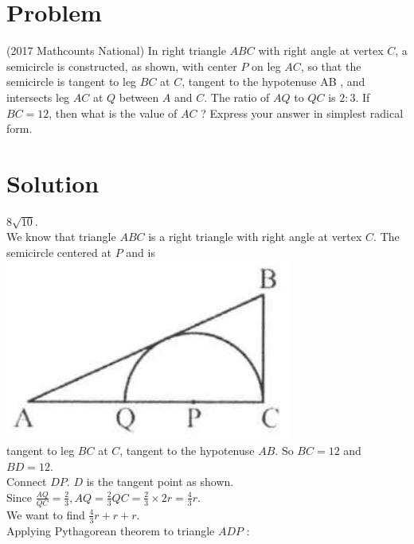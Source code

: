 \documentclass{article}
\begin{document}
\section*{Problem}
(2017 Mathcounts National) In right triangle \(A B C\) with right angle at vertex \(C\), a semicircle is constructed, as shown, with center \(P\) on leg \(A C\), so that the semicircle is tangent to leg \(B C\) at \(C\), tangent to the hypotenuse AB , and intersects leg \(A C\) at \(Q\) between \(A\) and \(C\). The ratio of \(A Q\) to \(Q C\) is \(2: 3\). If \(B C=12\), then what is the value of \(A C\) ? Express your answer in simplest radical form.

\section*{Solution}
\(8 \sqrt{10}\).\\
We know that triangle \(A B C\) is a right triangle with right angle at vertex \(C\). The semicircle centered at \(P\) and is\\
\centering
\includegraphics[width=\textwidth]{images/160(2).jpg}\\
tangent to leg \(B C\) at \(C\), tangent to the hypotenuse \(A B\). So \(B C=12\) and \(B D=12\).\\
Connect \(D P\). \(D\) is the tangent point as shown.\\
Since \(\frac{A Q}{Q C}=\frac{2}{3}, A Q=\frac{2}{3} Q C=\frac{2}{3} \times 2 r=\frac{4}{3} r\).\\
We want to find \(\frac{4}{3} r+r+r\).\\
Applying Pythagorean theorem to triangle \(A D P\) :\\
\centering
\end{document}
